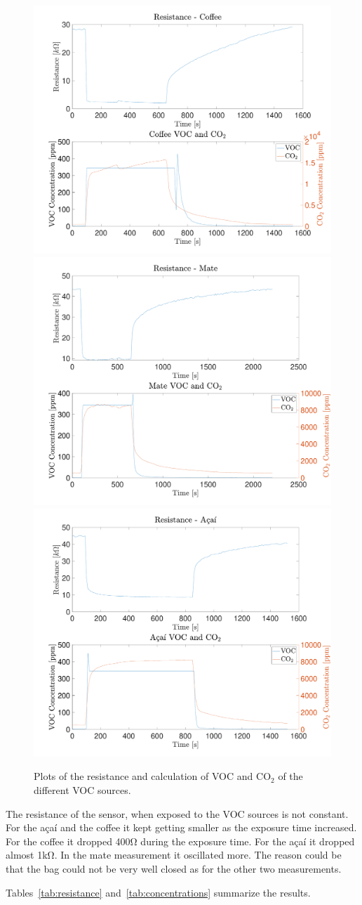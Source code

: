 \documentclass[DIV=14]{scrartcl}
\begin{document}
    \begin{figure}[h]
        \centering
        \includegraphics[width=.45\textwidth]{plots/plotCoffee}
        \includegraphics[width=.45\textwidth]{plots/plotMate}
        \includegraphics[width=.45\textwidth]{plots/plotAcai}
        \caption{Plots of the resistance and calculation of VOC and $\mathrm{CO_2}$ of the different VOC sources.}
        \label{fig:vocSourceExposure}
    \end{figure}

    The resistance of the sensor, when exposed to the VOC sources is not constant.
    For the a\c{c}a\'i and the coffee it kept getting smaller as the exposure time increased.
    For the coffee it dropped 400\si{\ohm} during the exposure time.
    For the a\c{c}a\'i it dropped almost 1\si{\kilo\ohm}.
    In the mate measurement it oscillated more.
    The reason could be that the bag could not be very well closed as for the other two measurements.

    Tables~\ref{tab:resistance} and~\ref{tab:concentrations} summarize the results.
\end{document}
